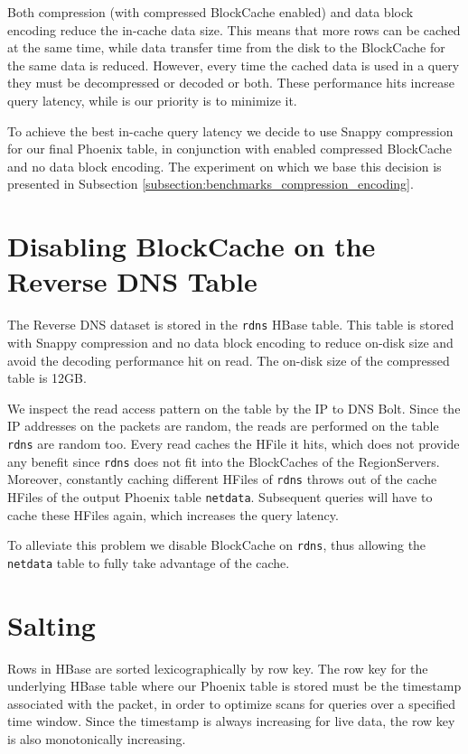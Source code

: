 Both compression (with compressed BlockCache enabled) and data block encoding reduce the in-cache data size. This means that more rows can be cached at the same time, while data transfer time from the disk to the BlockCache for the same data is reduced. However, every time the cached data is used in a query they must be decompressed or decoded or both. These performance hits increase query latency, while is our priority is to minimize it.

To achieve the best in-cache query latency we decide to use Snappy compression for our final Phoenix table, in conjunction with enabled compressed BlockCache and no data block encoding. The experiment on which we base this decision is presented in Subsection \ref{subsection:benchmarks_compression_encoding}.


\section{Disabling BlockCache on the Reverse DNS Table}

The Reverse DNS dataset is stored in the \texttt{rdns} HBase table. This table is stored with Snappy compression and no data block encoding to reduce on-disk size and avoid the decoding performance hit on read. The on-disk size of the compressed table is 12GB.

We inspect the read access pattern on the table by the IP to DNS Bolt. Since the IP addresses on the packets are random, the reads are performed on the table \texttt{rdns} are random too. Every read caches the HFile it hits, which does not provide any benefit since \texttt{rdns} does not fit into the BlockCaches of the RegionServers. Moreover, constantly caching different HFiles of \texttt{rdns} throws out of the cache HFiles of the output Phoenix table \texttt{netdata}. Subsequent queries will have to cache these HFiles again, which increases the query latency.

To alleviate this problem we disable BlockCache on \texttt{rdns}, thus allowing the \texttt{netdata} table to fully take advantage of the cache.


\section{Salting}\label{section:optimizations_salting}

Rows in HBase are sorted lexicographically by row key. The row key for the underlying HBase table where our Phoenix table is stored must be the timestamp associated with the packet, in order to optimize scans for queries over a specified time window. Since the timestamp is always increasing for live data, the row key is also monotonically increasing.

